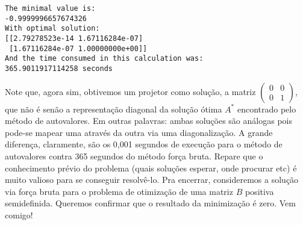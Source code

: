 \documentclass[11pt]{article}
\begin{document}
    \begin{Verbatim}[commandchars=\\\{\}]
The minimal value is:
-0.9999996657674326
With optimal solution:
[[2.79278523e-14 1.67116284e-07]
 [1.67116284e-07 1.00000000e+00]]
And the time consumed in this calculation was:
365.9011917114258 seconds
    \end{Verbatim}

    Note que, agora sim, obtivemos um projetor como solução, a matriz
\(\begin{pmatrix} 0 & 0 \\ 0 & 1 \end{pmatrix}\), que não é senão a
representação diagonal da solução ótima \(A^*\) encontrado pelo método
de autovalores. Em outras palavras: ambas soluções são análogas pois
pode-se mapear uma através da outra via uma diagonalização. A grande
diferença, claramente, são os 0,001 segundos de execução para o método
de autovalores contra 365 segundos do método força bruta. Repare que o
conhecimento prévio do problema (quais soluções esperar, onde procurar
etc) é muito valioso para se conseguir resolvê-lo. Pra encerrar,
consideremos a solução via força bruta para o problema de otimização de
uma matriz \(B\) positiva semidefinida. Queremos confirmar que o
resultado da minimização é zero. Vem comigo!
\end{document}
